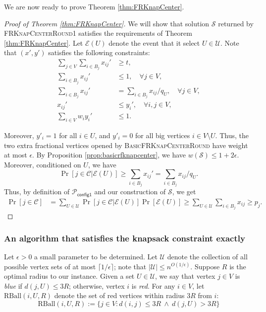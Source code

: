 \documentclass[a4paper,11pt]{article}
\newcommand{\C}{\mathcal{C}}
\renewcommand{\S}{\mathcal{S}}
\newcommand{\U}{\mathcal{U}}
\renewcommand{\P}{\mathcal{P}}
\newcommand{\e}{\mathcal{E}}
\newcommand{\RBall}{\mathrm{RBall}}
\begin{document}
We are now ready to prove Theorem \ref{thm:FRKnapCenter}.

\begin{proof}[Proof of Theorem \ref{thm:FRKnapCenter}]
We will show that solution $\S$ returned by \textsc{FRKnapCenterRound1} satisfies the requirements of Theorem \ref{thm:FRKnapCenter}. Let $\e(U)$ denote the event that it select $U \in \U$. Note that $(x', y')$ satisfies the following constraints:
\begin{align*}
	\sum_{j \in V} \sum_{i \in B_j} x_{ij}' &\geq t, \\
	\sum_{i \in B_j} x_{ij}' &\leq 1, \quad \forall j \in V, \\
	\sum_{i \in B_j} x_{ij}' &= \sum_{i \in B_j} x_{ij} / q_U, \quad  \forall j \in V, \\
	x_{ij}' &\leq y_i', \quad \forall i,j \in V, \\
	\sum_{i \in V} w_iy_i' &\leq 1.
\end{align*}

Moreover, $y'_i = 1$ for all $i \in U$, and $y'_i = 0$ for all big vertices $i \in V \setminus U$. Thus, the two extra fractional vertices opened by \textsc{BasicFRKnapCenterRound} have  weight at most $\epsilon$. By Proposition \ref{prop:basicrfknapcenter}, we have $w(\S) \leq 1 + 2\epsilon$. Moreover, conditioned on $U$, we have 
$$\Pr[j \in \C | \e(U)] \geq  \sum_{i \in B_j} x_{ij}' = \sum_{i \in B_j} x_{ij} / q_U.$$
Thus, by definition of $\P_\textsf{config1}$ and our construction of $\S$, we get
\begin{align*}
	\Pr[j \in \C] &= \sum_{U \in \U} \Pr[j \in \C | \e(U)] \Pr[\e(U)] \geq \sum_{U \in \U} \sum_{i \in B_j} x_{ij} \geq p_j.
\end{align*}

\end{proof}



\subsubsection{An algorithm that satisfies the knapsack constraint exactly} \label{sec:knap_exact}

Let $\epsilon > 0$ a small parameter to be determined. Let $\U$ denote the collection of all possible vertex sets of at most $\lceil 1/\epsilon \rceil$; note that $|\U| \leq n^{O(1/\epsilon)}$. Suppose $R$ is the optimal radius to our instance. Given a set $U \in \U$, we say that vertex $j \in V$ is \emph{blue} if $d(j,U) \leq 3 R$; otherwise, vertex $i$ is \emph{red}. For any $i \in V$, let $\RBall(i, U, R)$ denote the set of red vertices within radius $3R$ from $i$:
$$ \RBall(i, U, R) := \{j \in V: d(i,j) \leq 3R ~\wedge~  d(j,U) > 3 R \}
$$
\end{document}
